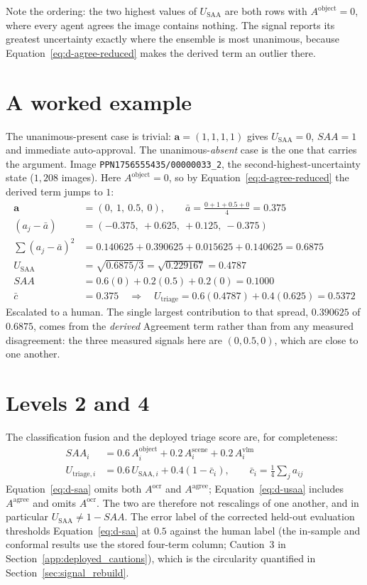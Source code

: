 \documentclass[12pt,a4paper]{report}
\begin{document}
Note the ordering: the two highest values of $U_{\text{SAA}}$ are both rows with $A^{\text{object}}=0$, where every agent agrees the image contains nothing. The signal reports its greatest uncertainty exactly where the ensemble is most unanimous, because Equation~\ref{eq:d-agree-reduced} makes the derived term an outlier there.

\section{A worked example}

The unanimous-present case is trivial: $\mathbf{a}=(1,1,1,1)$ gives $U_{\text{SAA}}=0$, $SAA=1$ and immediate auto-approval. The unanimous-\emph{absent} case is the one that carries the argument. Image \texttt{PPN1756555435/00000033\_2}, the second-highest-uncertainty state ($1{,}208$ images). Here $A^{\text{object}}=0$, so by Equation~\ref{eq:d-agree-reduced} the derived term jumps to $1$:
\begin{align*}
\mathbf{a} &= (0,\ 1,\ 0.5,\ 0), \qquad \bar{a} = \tfrac{0+1+0.5+0}{4} = 0.375\\
(a_j - \bar a) &= (-0.375,\ +0.625,\ +0.125,\ -0.375)\\
\textstyle\sum (a_j-\bar a)^2 &= 0.140625 + 0.390625 + 0.015625 + 0.140625 = 0.6875\\
U_{\text{SAA}} &= \sqrt{0.6875/3} = \sqrt{0.229167} = \mathbf{0.4787}\\
SAA &= 0.6(0) + 0.2(0.5) + 0.2(0) = \mathbf{0.1000}\\
\bar{c} &= 0.375 \quad\Rightarrow\quad U_{\text{triage}} = 0.6(0.4787) + 0.4(0.625) = \mathbf{0.5372}
\end{align*}
Escalated to a human. The single largest contribution to that spread, $0.390625$ of $0.6875$, comes from the \emph{derived} Agreement term rather than from any measured disagreement: the three measured signals here are $(0, 0.5, 0)$, which are close to one another.

\section{Levels 2 and 4}

The classification fusion and the deployed triage score are, for completeness:
\begin{align}
SAA_i &= 0.6\,A_i^{\text{object}} + 0.2\,A_i^{\text{scene}} + 0.2\,A_i^{\text{vlm}} \label{eq:d-saa}\\
U_{\text{triage},i} &= 0.6\,U_{\text{SAA},i} + 0.4\left(1 - \bar{c}_i\right), \qquad \bar{c}_i = \tfrac14\textstyle\sum_j a_{ij} \label{eq:d-triage}
\end{align}
Equation~\ref{eq:d-saa} omits both $A^{\text{ocr}}$ and $A^{\text{agree}}$; Equation~\ref{eq:d-usaa} includes $A^{\text{agree}}$ and omits $A^{\text{ocr}}$. The two are therefore not rescalings of one another, and in particular $U_{\text{SAA}} \neq 1 - SAA$. The error label of the corrected held-out evaluation thresholds Equation~\ref{eq:d-saa} at $0.5$ against the human label (the in-sample and conformal results use the stored four-term column; Caution~3 in Section~\ref{app:deployed_cautions}), which is the circularity quantified in Section~\ref{sec:signal_rebuild}.
\end{document}
